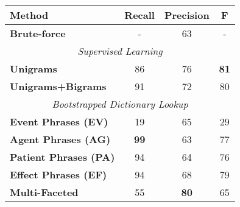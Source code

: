 \begin{table}[ht]
\small
\centering
\begin{tabular}[center]{|lccc|} \hline
{\bf Method} & {\bf Recall} & {\bf Precision} & {\bf F}\\ \hline 
{\bf Brute-force} & - & 63 & - \\ \hline
\multicolumn{4}{|c|}{\it Supervised Learning} \\ \hline
{\bf Unigrams} & 86 & 76 & {\bf 81} \\
{\bf Unigrams+Bigrams} & 91 & 72 & 80 \\ \hline
\multicolumn{4}{|c|}{\it Bootstrapped Dictionary Lookup} \\ \hline
{\bf Event Phrases (EV)} & 19 & 65 & 29\\
{\bf Agent Phrases (AG)} & {\bf 99} & 63 & 77\\
{\bf Patient Phrases (PA)} & 94 & 64 & 76\\
{\bf Effect Phrases (EF)} & 94 & 68 & 79\\ 
{\bf Multi-Faceted} & 55 & {\bf 80} & 65\\ \hline

\end{tabular}
\end{table}
